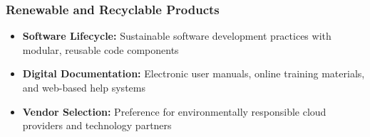 \subsubsection{Renewable and Recyclable Products}
\begin{itemize}
    \item \textbf{Software Lifecycle:} Sustainable software development practices with modular, reusable code components
    \item \textbf{Digital Documentation:} Electronic user manuals, online training materials, and web-based help systems
    \item \textbf{Vendor Selection:} Preference for environmentally responsible cloud providers and technology partners
\end{itemize}



